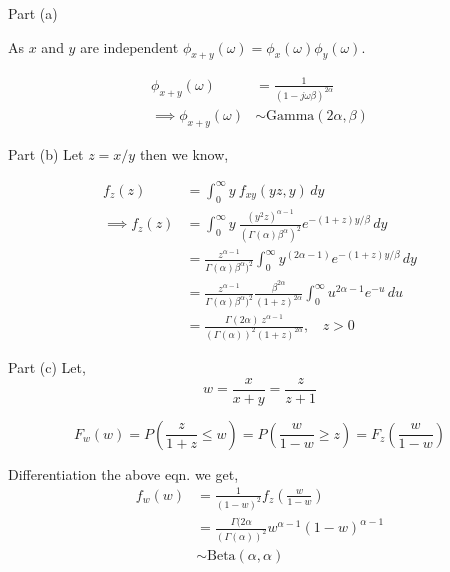 \documentclass{beamer}
\begin{document}
\begin{frame}{Part (a)}

    As $x$ and $y$ are independent $\phi_{x+y} (\omega) = \phi_x (\omega) \phi_y (\omega) $.

    \begin{align}
        \phi_{x+y} (\omega) &= \frac{1}{(1 - j \omega \beta )^{2\alpha}} \\
        \implies \phi_{x+y} (\omega) &\sim \text{Gamma} (2\alpha, \beta)
    \end{align}
    
\end{frame} 

\begin{frame}{Part (b)}
    Let $z =  x/y$ then we know,
    
    \begin{align}
        f_z(z) &= \int_{0}^{\infty} y\ f_{xy}(yz , y) \,dy \\
        \implies f_z(z) &= \int_{0}^{\infty} y\ \frac{(y^2 z)^{\alpha - 1}}{(\Gamma(\alpha) \beta ^ \alpha)^2} e^{-(1+z)y/\beta} \,dy\\
        &= \frac{z^{\alpha-1}}{\Gamma(\alpha) \beta ^ \alpha)^2}\int_{0}^{\infty} y^{(2\alpha - 1)}e^{-(1+z)y/\beta} \,dy\\
        &= \frac{z^{\alpha-1}}{\Gamma(\alpha) \beta ^ \alpha)^2} \frac{\beta^{2\alpha}}{(1+z)^{2\alpha}}\int_{0}^{\infty} u^{2\alpha - 1} e^{-u} \,du\\
        &= \frac{\Gamma(2\alpha)\ z^{\alpha - 1}}{(\Gamma(\alpha))^2 (1+z)^ {2\alpha}},\ \ \ \ z > 0
    \end{align}
\end{frame}

\begin{frame}{Part (c)}
    Let, 
    \begin{equation}
        w = \frac{x}{x+y} = \frac{z}{z+1}
    \end{equation}
    
    \begin{equation}
        F_w(w) = P\left(\frac{z}{1+z} \leq w\right) = P\left(\frac{w}{1-w} \geq z\right) = F_z\left(\frac{w}{1-w}\right)
    \end{equation}
    
    Differentiation the above eqn. we get, 
    \begin{align}
        f_w(w) &= \frac{1}{(1-w)^2} f_z\left(\frac{w}{1-w} \right) \\
        &= \frac{\Gamma(2\alpha}{(\Gamma(\alpha))^2} w^{\alpha - 1} (1-w)^{\alpha - 1}\\
        &\sim \text{Beta} (\alpha, \alpha)
    \end{align}
\end{frame}
\end{document}
